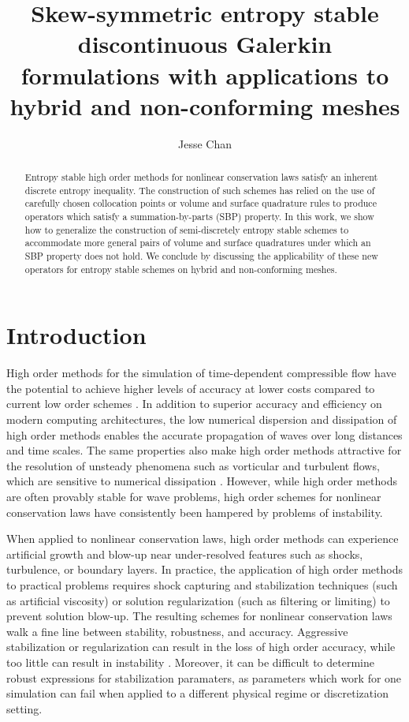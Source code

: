 \documentclass[review]{siamart0216}
\date{}
\author{Jesse Chan}%
\title{Skew-symmetric entropy stable discontinuous Galerkin formulations with applications to hybrid and non-conforming meshes}
\theoremstyle{assumption}
\begin{document}
\maketitle


\begin{abstract}
Entropy stable high order methods for nonlinear conservation laws satisfy an inherent discrete entropy inequality.  The construction of such schemes has relied on the use of carefully chosen collocation points \cite{gassner2013skew, fisher2013high, carpenter2014entropy, chan2018efficient} or volume and surface quadrature rules \cite{chan2017discretely, chan2018discretely} to produce operators which satisfy a summation-by-parts (SBP) property.  In this work, we show how to generalize the construction of semi-discretely entropy stable schemes to accommodate more general pairs of volume and surface quadratures under which an SBP property does not hold.  We conclude by discussing the applicability of these new operators for entropy stable schemes on hybrid and non-conforming meshes.  
\end{abstract}

\section{Introduction}

High order methods for the simulation of time-dependent compressible flow have the potential to achieve higher levels of accuracy at lower costs compared to current low order schemes \cite{wang2013high}.  In addition to superior accuracy and efficiency on modern computing architectures, the low numerical dispersion and dissipation of high order methods \cite{ainsworth2004dispersive} enables the accurate propagation of waves over long distances and time scales.  The same properties also make high order methods attractive for the resolution of unsteady phenomena such as vorticular and turbulent flows, which are sensitive to numerical dissipation \cite{visbal1999high, wang2013high}.  However, while high order methods are often provably stable for wave problems, high order schemes for nonlinear conservation laws have consistently been hampered by problems of instability.  

When applied to nonlinear conservation laws, high order methods can experience artificial growth and blow-up near under-resolved features such as shocks, turbulence, or boundary layers.  In practice, the application of high order methods to practical problems requires shock capturing and stabilization techniques (such as artificial viscosity) or solution regularization (such as filtering or limiting) to prevent solution blow-up.  The resulting schemes for nonlinear conservation laws walk a fine line between stability, robustness, and accuracy.  Aggressive stabilization or regularization can result in the loss of high order accuracy, while too little can result in instability \cite{wang2013high}.  Moreover, it can be difficult to determine robust expressions for stabilization paramaters, as parameters which work for one simulation can fail when applied to a different physical regime or discretization setting.  
\end{document}
